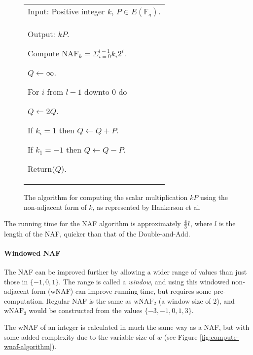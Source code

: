 \begin{figure}[htb!]
	\centering
	\begin{tabular}{|p{\textwidth}|}
		\hline
		Input: Positive integer \(k\), \(P \in E(\mathbb{F}_q)\). \\
		Output: \(kP\).

		\begin{enumerate*}
			\item Compute \(\text{NAF}_k = \Sigma^{l-1}_{i=0} k_i2^i\).
			\item \(Q \gets \infty\).
			\item For \(i\) from \(l-1\) downto \(0\) do
			\begin{enumerate*}
				\item \(Q \gets 2Q\).
				\item If \(k_i = 1\) then \(Q \gets Q + P\).
				\item If \(k_1 = -1\) then \(Q \gets Q - P\).
			\end{enumerate*}
			\item Return(\(Q\)).
		\end{enumerate*}
		\\
		\hline
	\end{tabular}
	\caption{The algorithm for computing the scalar multiplication \(kP\) using the non-adjacent form of \(k\), as represented by
		Hankerson et al.\cite{hankerson2010}}
	\label{fig:naf-algorithm}
\end{figure}

The running time for the NAF algorithm is approximately \({4 \over 3} l\), where \(l\) is the length of the NAF, quicker than that
of the Double-and-Add.\cite{hankerson2010}

\paragraph{Windowed NAF}

The NAF can be improved further by allowing a wider range of values than just those in \(\{-1,0,1\}\). The range is called a \emph{window}, and
using this windowed non-adjacent form (wNAF) can improve running time, but requires some pre-computation. Regular NAF is the same
as \(\text{wNAF}_2\) (a window size of 2), and \(\text{wNAF}_3\) would be constructed from the values \(\{-3,-1,0,1,3\}\).

The wNAF of an integer is calculated in much the same way as a NAF, but with some added complexity due to the variable size of \(w\)
(see Figure \ref{fig:compute-wnaf-algorithm}).

